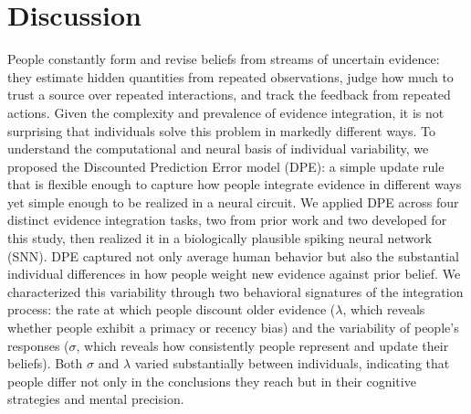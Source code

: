 \documentclass[12pt]{article}
\begin{document}
\section{Discussion}

People constantly form and revise beliefs from streams of uncertain evidence: they estimate hidden quantities from repeated observations, judge how much to trust a source over repeated interactions, and track the feedback from repeated actions. Given the complexity and prevalence of evidence integration, it is not surprising that individuals solve this problem in markedly different ways. To understand the computational and neural basis of individual variability, we proposed the Discounted Prediction Error model (DPE): a simple update rule that is flexible enough to capture how people integrate evidence in different ways yet simple enough to be realized in a neural circuit. We applied DPE across four distinct evidence integration tasks, two from prior work and two developed for this study, then realized it in a biologically plausible spiking neural network (SNN). DPE captured not only average human behavior but also the substantial individual differences in how people weight new evidence against prior belief. We characterized this variability through two behavioral signatures of the integration process: the rate at which people discount older evidence ($\lambda$, which reveals whether people exhibit a primacy or recency bias) and the variability of people's responses ($\sigma$, which reveals how consistently people represent and update their beliefs). Both $\sigma$ and $\lambda$ varied substantially between individuals, indicating that people differ not only in the conclusions they reach but in their cognitive strategies and mental precision.
\end{document}
